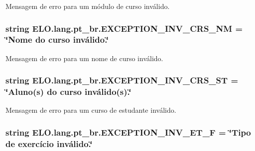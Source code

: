 Mensagem de erro para um módulo de curso inválido. 

\hypertarget{namespaceELO_1_1lang_1_1pt__br_a932693823770aec33094ffa955e36e2f}{
\subsubsection[{E\-X\-C\-E\-P\-T\-I\-O\-N\-\_\-\-I\-N\-V\-\_\-\-C\-R\-S\-\_\-\-N\-M}]{\setlength{\rightskip}{0pt plus 5cm}string E\-L\-O.\-lang.\-pt\-\_\-br.\-E\-X\-C\-E\-P\-T\-I\-O\-N\-\_\-\-I\-N\-V\-\_\-\-C\-R\-S\-\_\-\-N\-M = \char`\"{}Nome do curso inválido.\char`\"{}}}\label{d5/d70/namespaceELO_1_1lang_1_1pt__br_a932693823770aec33094ffa955e36e2f}


Mensagem de erro para um nome de curso inválido. 

\hypertarget{namespaceELO_1_1lang_1_1pt__br_afd5c3c43d1a75fbf50d204dc3a4682a7}{
\subsubsection[{E\-X\-C\-E\-P\-T\-I\-O\-N\-\_\-\-I\-N\-V\-\_\-\-C\-R\-S\-\_\-\-S\-T}]{\setlength{\rightskip}{0pt plus 5cm}string E\-L\-O.\-lang.\-pt\-\_\-br.\-E\-X\-C\-E\-P\-T\-I\-O\-N\-\_\-\-I\-N\-V\-\_\-\-C\-R\-S\-\_\-\-S\-T = \char`\"{}Aluno(s) do curso inválido(s).\char`\"{}}}\label{d5/d70/namespaceELO_1_1lang_1_1pt__br_afd5c3c43d1a75fbf50d204dc3a4682a7}


Mensagem de erro para um curso de estudante inválido. 

\hypertarget{namespaceELO_1_1lang_1_1pt__br_ae7a2eea8b3cf7b835f5ec0334fe49ecc}{
\subsubsection[{E\-X\-C\-E\-P\-T\-I\-O\-N\-\_\-\-I\-N\-V\-\_\-\-E\-T\-\_\-\-F}]{\setlength{\rightskip}{0pt plus 5cm}string E\-L\-O.\-lang.\-pt\-\_\-br.\-E\-X\-C\-E\-P\-T\-I\-O\-N\-\_\-\-I\-N\-V\-\_\-\-E\-T\-\_\-\-F = \char`\"{}Tipo de exercício inválido.\char`\"{}}}\label{d5/d70/namespaceELO_1_1lang_1_1pt__br_ae7a2eea8b3cf7b835f5ec0334fe49ecc}


